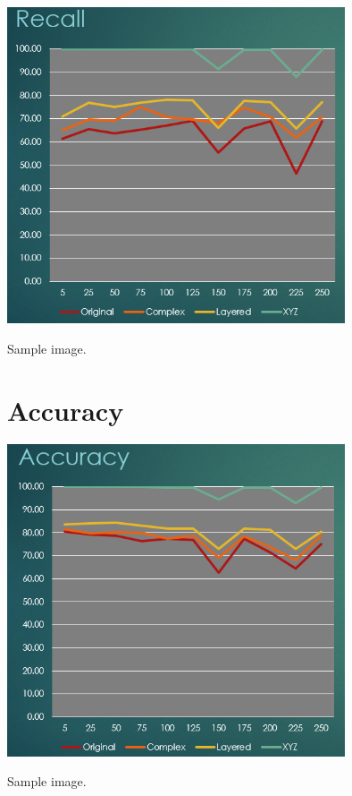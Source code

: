 \documentclass[]{report}
\begin{document}
\begin{minipage}{\linewidth}
	\begin{minipage}{0.49\textwidth}
		\centering
		\includegraphics[width=0.75\textwidth]{../recall}
	\end{minipage}
	\hfill
	\begin{minipage}{0.49\textwidth}
		\centering
		Sample image.
	\end{minipage}
\end{minipage}

\section{Accuracy}

\begin{minipage}{\linewidth}
	\begin{minipage}{0.49\textwidth}
		\centering
		\includegraphics[width=0.75\textwidth]{../accuracy}
	\end{minipage}
	\hfill
	\begin{minipage}{0.49\textwidth}
		\centering
		Sample image.
	\end{minipage}
\end{minipage}
\end{document}
